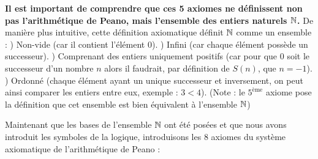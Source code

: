 \textbf{Il est important de comprendre que ces 5 axiomes ne définissent non pas l'arithmétique de Peano, mais l'ensemble des entiers naturels $\mathbb{N}$.} \newline
\newline
De manière plus intuitive, cette définition axiomatique définit $\mathbb{N}$ comme un ensemble : ) Non-vide (car il contient l'élément $0$). ) Infini (car chaque élément possède un successeur). ) Comprenant des entiers uniquement positifs (car pour que $0$ soit le successeur d'un nombre $n$ alors il faudrait, par définition de $S(n)$, que $n=-1$). ) Ordonné (chaque élément ayant un unique successeur et inversement, on peut ainsi comparer les entiers entre eux, exemple : $3 < 4$). \newline
\newline
(Note : le $5^{\text{ème}}$ axiome pose la définition que cet ensemble est bien équivalent à l'ensemble $\mathbb{N}$) \newline

Maintenant que les bases de l'ensemble $\mathbb{N}$ ont été posées et que nous avons introduit les symboles de la logique, introduisons les 8 axiomes du système axiomatique de l'arithmétique de Peano :

